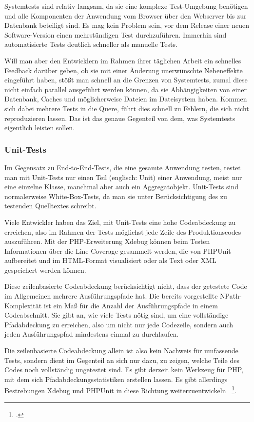 Systemtests sind relativ langsam, da sie eine komplexe Test-Umgebung benötigen und alle Komponenten der Anwendung vom Browser über den Webserver bis zur Datenbank beteiligt sind. Es mag kein Problem sein, vor dem Release einer neuen Software-Version einen mehrstündigen Test durchzuführen. Immerhin sind automatisierte Tests deutlich schneller als manuelle Tests.

Will man aber den Entwicklern im Rahmen ihrer täglichen Arbeit ein schnelles Feedback darüber geben, ob sie mit einer Änderung unerwünschte Nebeneffekte eingeführt haben, stößt man schnell an die Grenzen von Systemtests, zumal diese nicht einfach parallel ausgeführt werden können, da sie Abhängigkeiten von einer Datenbank, Caches und möglicherweise Dateien im Dateisystem haben. Kommen sich dabei mehrere Tests in die Quere, führt dies schnell zu Fehlern, die sich nicht reproduzieren lassen. Das ist das genaue Gegenteil von dem, was Systemtests eigentlich leisten sollen.

\subsubsection{Unit-Tests}
Im Gegensatz zu End-to-End-Tests, die eine gesamte Anwendung testen, testet man mit Unit-Tests nur einen Teil (englisch: Unit) einer Anwendung, meist nur eine einzelne Klasse, manchmal aber auch ein Aggregatobjekt. Unit-Tests sind normalerweise White-Box-Tests, da man sie unter Berücksichtigung des zu testenden Quelltextes schreibt.

Viele Entwickler haben das Ziel, mit Unit-Tests eine hohe Codeabdeckung zu erreichen, also im Rahmen der Tests möglichst jede Zeile des Produktionscodes auszuführen. Mit der PHP-Erweiterung Xdebug können beim Testen Informationen über die Line Coverage gesammelt werden, die von PHPUnit aufbereitet und im HTML-Format visualisiert oder als Text oder XML gespeichert werden können.

Diese zeilenbasierte Codeabdeckung berücksichtigt nicht, dass der getestete Code im Allgemeinen mehrere Ausführungspfade hat. Die bereits vorgestellte NPath-Komplexität ist ein Maß für die Anzahl der Ausführungspfade in einem Codeabschnitt. Sie gibt an, wie viele Tests nötig sind, um eine vollständige Pfadabdeckung zu erreichen, also um nicht nur jede Codezeile, sondern auch jeden Ausführungspfad mindestens einmal zu durchlaufen.

Die zeilenbasierte Codeabdeckung allein ist also kein Nachweis für umfassende Tests, sondern dient im Gegenteil an sich nur dazu, zu zeigen, welche Teile des Codes noch vollständig ungetestet sind. Es gibt derzeit kein Werkzeug für PHP, mit dem sich Pfadabdeckungsstatistiken erstellen lassen. Es gibt allerdings Bestrebungen Xdebug und PHPUnit in diese Richtung weiterzuentwickeln ~\footcite[Vgl.]{Vergmann.2011}.

